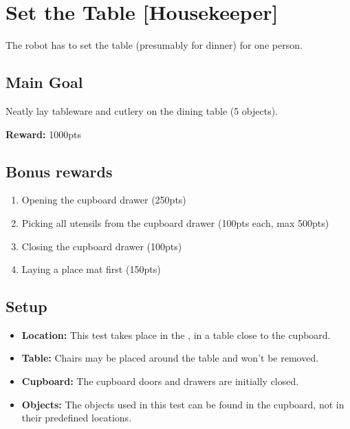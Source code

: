 \section{Set the Table [Housekeeper]}
\label{test:set-the-table}
The robot has to set the table (presumably for dinner) for one person.


\subsection*{Main Goal}
Neatly lay tableware and cutlery on the dining table (5 objects).

\noindent\textbf{Reward:} 1000pts

\subsection*{Bonus rewards}
\begin{enumerate}[nosep]
	\item Opening the cupboard drawer (250pts)
	\item Picking all utensils from the cupboard drawer (100pts each, max 500pts)
	\item Closing the cupboard drawer (100pts)
	\item Laying a place mat first (150pts)
\end{enumerate}

\subsection*{Setup}
\begin{itemize}[nosep]
	\item \textbf{Location:} This test takes place in the \Arena{}, in a table close to the cupboard.
	\item \textbf{Table:} Chairs may be placed around the table and won't be removed.
	\item \textbf{Cupboard:} The cupboard doors and drawers are initially closed.
	\item \textbf{Objects:} The objects used in this test can be found in the cupboard, not in their predefined locations.
\end{itemize}


